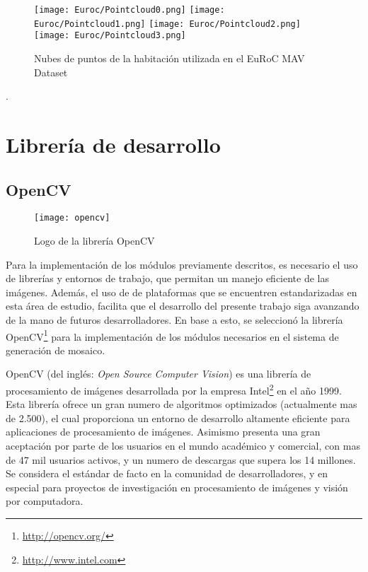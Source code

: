 \begin{figure}[H]
	\centering
	\texttt{[image: Euroc/Pointcloud0.png]}
	\texttt{[image: Euroc/Pointcloud1.png]}
	\texttt{[image: Euroc/Pointcloud2.png]}
	\texttt{[image: Euroc/Pointcloud3.png]}
	\caption{Nubes de puntos de la habitación utilizada en el EuRoC MAV Dataset}
	\label{fig:pointcloudEuroc}
\end{figure}

.


\section{Librería de desarrollo}

\subsection{OpenCV}

\begin{wrapfigure}{R}{5cm}
	\begin{center}
		\vspace*{-0.2in}
		\texttt{[image: opencv]}
	\end{center}
	\caption{Logo de la librería OpenCV}
\end{wrapfigure}

Para la implementación de los módulos previamente descritos, es necesario el uso de librerías y entornos de trabajo, que permitan un manejo eficiente de las imágenes. Además, el uso de de plataformas que se encuentren estandarizadas en esta área de estudio, facilita que el desarrollo del presente trabajo siga avanzando de la mano de futuros desarrolladores. En base a esto, se seleccionó la librería OpenCV\footnote{\url{http://opencv.org/}} para la implementación de los módulos necesarios en el sistema de generación de mosaico.

OpenCV (del inglés: \textit{Open Source Computer Vision}) es una librería de procesamiento de imágenes desarrollada por la empresa Intel\footnote{\url{http://www.intel.com}} en el año 1999. Esta librería ofrece un gran numero de algoritmos optimizados (actualmente mas de 2.500), el cual proporciona un entorno de desarrollo altamente eficiente para aplicaciones de procesamiento de imágenes. Asimismo presenta una gran aceptación por parte de los usuarios en el mundo académico y comercial, con mas de 47 mil usuarios activos, y un numero de descargas que supera los 14 millones. Se considera el estándar de facto en la comunidad de desarrolladores, y en especial para proyectos de investigación en procesamiento de imágenes y visión por computadora. 

